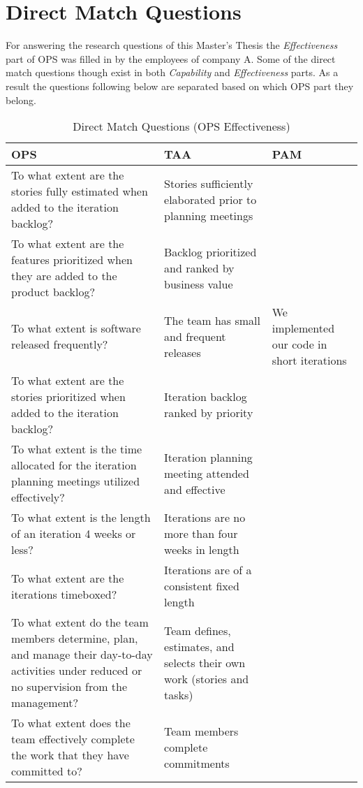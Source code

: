 \chapter{Direct Match Questions}
\label{ch:direct_match_questions}

For answering the research questions of this Master's Thesis the \textit{Effectiveness} part of \ac{OPS} was filled in by the employees of company A. Some of the direct match questions though exist in both \textit{Capability} and \textit{Effectiveness} parts. As a result the questions following below are separated based on which \ac{OPS} part they belong.

\begin{longtable} {| p{5cm} | p{4cm} | p{4cm} |} \caption{Direct Match Questions (OPS Effectiveness)} \\ \hline
	\label{table:direct_match_table_effectiveness} 	
		\textbf{OPS} & \textbf{TAA}  & \textbf{PAM} \\ \hline \endhead
		To what extent are the stories fully estimated when added to the iteration backlog? & 	Stories sufficiently elaborated prior to planning meetings & \\ \hline
		To what extent are the features prioritized when they are added to the product backlog? & Backlog prioritized and ranked by business value & \\ \hline
		To what extent is software released frequently? & 
		The team has small and frequent releases & We implemented our code in short iterations \\ \hline
		To what extent are the stories prioritized when added to the iteration backlog? & Iteration backlog ranked by priority & \\ \hline
		To what extent is the time allocated for the iteration planning meetings utilized effectively? & Iteration planning meeting attended and effective & \\ \hline
		To what extent is the length of an iteration 4 weeks or less? & Iterations are no more than four weeks in length & \\ \hline
		To what extent are the iterations timeboxed? & Iterations are of a consistent fixed length &  \\ \hline
		To what extent do the team members determine, plan, and manage their day-to-day activities under reduced or no supervision from the management? & Team defines, estimates, and selects their own work (stories and tasks) &  \\ \hline
		To what extent does the team effectively complete the work that they have committed to? & Team members complete commitments & \\ \hline

\end{longtable}
